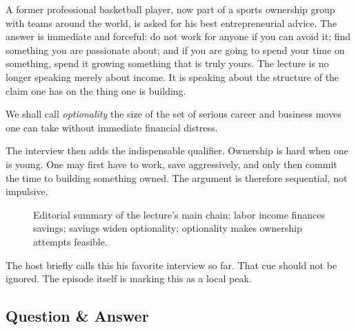 A former professional basketball player, now part of a sports ownership group with teams around the world, is asked for his best entrepreneurial advice. The answer is immediate and forceful: do not work for anyone if you can avoid it; find something you are passionate about; and if you are going to spend your time on something, spend it growing something that is truly yours. The lecture is no longer speaking merely about income. It is speaking about the structure of the claim one has on the thing one is building.

\begin{definition}
We shall call \emph{optionality} the size of the set of serious career and business moves one can take without immediate financial distress.
\end{definition}

The interview then adds the indispensable qualifier. Ownership is hard when one is young. One may first have to work, save aggressively, and only then commit the time to building something owned. The argument is therefore sequential, not impulsive.

\begin{figure}[h]
\centering
{}
\caption{Editorial summary of the lecture's main chain: labor income finances savings; savings widen optionality; optionality makes ownership attempts feasible.}
\end{figure}

The host briefly calls this his favorite interview so far. That cue should not be ignored. The episode itself is marking this as a local peak.

\subsection{Question \& Answer}

